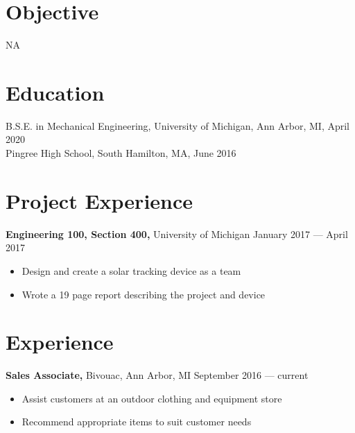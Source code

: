 \documentclass[margin]{res}
\begin{document}

\address{{\bf Present Address} \\ 1021 Vaughn St \\ The Dean Apt 1 \\ Ann Arbor, MI 48104  \\ (978) 873-7207 }
\address{{\bf Permanent Address} \\ 1499 Salem Street \\ North Andover, MA 01845 \\ (978) 725-4887 }


\begin{resume}

	\section{Objective}
	NA

	\section{Education}
	B.S.E. in Mechanical Engineering, University of Michigan, Ann Arbor, MI, April 2020 \\
	Pingree High School, South Hamilton, MA, June 2016

  \section{Project Experience}
  {\bf Engineering 100, Section 400,} University of Michigan \hfill January 2017 --- April 2017
  \begin{itemize} \itemsep -2pt
    \item Design and create a solar tracking device as a team
    \item Wrote a 19 page report describing the project and device
  \end{itemize}

	\section{Experience}
	{\bf Sales Associate,} Bivouac, Ann Arbor, MI \hfill September 2016 --- current
	\begin{itemize} \itemsep -2pt
		\item Assist customers at an outdoor clothing and equipment store
		\item Recommend appropriate items to suit customer needs
	\end{itemize}


\end{resume}
\end{document}
